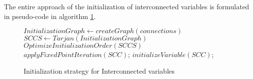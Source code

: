 The entire approach of the initialization of interconnected variables is formulated in pseudo-code in algorithm \ref{alg:initialization}.
\begin{figure}[htb]
  \centering
    \begin{algorithm}[H]
    \caption{Initialization strategy for Interconnected variables}
    \label{alg:initialization}
      \begin{algorithmic}[1]
        \State $InitializationGraph \gets createGraph(connections)$
        \State $SCCS \gets Tarjan(InitializationGraph)$
        \State $OptimizeInitializationOrder(SCCS)$
                \State $applyFixedPointIteration(SCC)$;
            \Else
                \State $initializeVariable(SCC)$;
            \EndIf
        \EndFor
        \end{algorithmic}
    \end{algorithm}
\end{figure}



